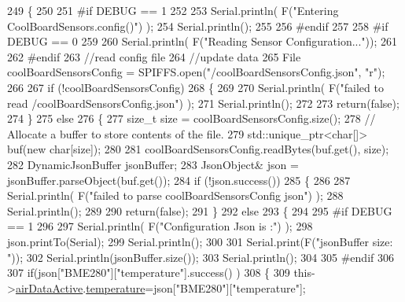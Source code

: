 \begin{DoxyCode}
249 \{
250 
251 \textcolor{preprocessor}{#if DEBUG == 1}
252 
253     Serial.println( F(\textcolor{stringliteral}{"Entering CoolBoardSensors.config()"}) );
254     Serial.println();
255 
256 \textcolor{preprocessor}{#endif}
257 
258 \textcolor{preprocessor}{#if DEBUG == 0}
259 
260     Serial.println( F(\textcolor{stringliteral}{"Reading Sensor Configuration..."}));
261 
262 \textcolor{preprocessor}{#endif}
263     \textcolor{comment}{//read config file}
264     \textcolor{comment}{//update data}
265     File coolBoardSensorsConfig = SPIFFS.open(\textcolor{stringliteral}{"/coolBoardSensorsConfig.json"}, \textcolor{stringliteral}{"r"});
266 
267     \textcolor{keywordflow}{if} (!coolBoardSensorsConfig) 
268     \{
269     
270         Serial.println( F(\textcolor{stringliteral}{"failed to read /coolBoardSensorsConfig.json"}) );
271         Serial.println();
272 
273         \textcolor{keywordflow}{return}(\textcolor{keyword}{false});
274     \}
275     \textcolor{keywordflow}{else}
276     \{
277         \textcolor{keywordtype}{size\_t} size = coolBoardSensorsConfig.size();
278         \textcolor{comment}{// Allocate a buffer to store contents of the file.}
279         std::unique\_ptr<char[]> buf(\textcolor{keyword}{new} \textcolor{keywordtype}{char}[size]);
280 
281         coolBoardSensorsConfig.readBytes(buf.get(), size);
282         DynamicJsonBuffer jsonBuffer;
283         JsonObject& json = jsonBuffer.parseObject(buf.get());
284         \textcolor{keywordflow}{if} (!json.success()) 
285         \{
286 
287             Serial.println( F(\textcolor{stringliteral}{"failed to parse coolBoardSensorsConfig json"}) );
288             Serial.println();
289     
290             \textcolor{keywordflow}{return}(\textcolor{keyword}{false});
291         \} 
292         \textcolor{keywordflow}{else}
293         \{
294 
295 \textcolor{preprocessor}{        #if DEBUG == 1}
296 
297             Serial.println( F(\textcolor{stringliteral}{"Configuration Json is :"}) );
298             json.printTo(Serial);
299             Serial.println();
300 
301             Serial.print(F(\textcolor{stringliteral}{"jsonBuffer size: "}));
302             Serial.println(jsonBuffer.size());
303             Serial.println();
304         
305 \textcolor{preprocessor}{        #endif}
306             
307             \textcolor{keywordflow}{if}(json[\textcolor{stringliteral}{"BME280"}][\textcolor{stringliteral}{"temperature"}].success() )
308             \{           
309                 this->\hyperlink{class_cool_board_sensors_abff8dfeccb2f7689847bb64d5f1cd31e}{airDataActive}.\hyperlink{struct_cool_board_sensors_1_1air_active_a9a6633c426b0508e30ebc1832ec6d745}{temperature}=json[\textcolor{stringliteral}{"BME280"}][\textcolor{stringliteral}{"temperature"}];

\end{DoxyCode}
